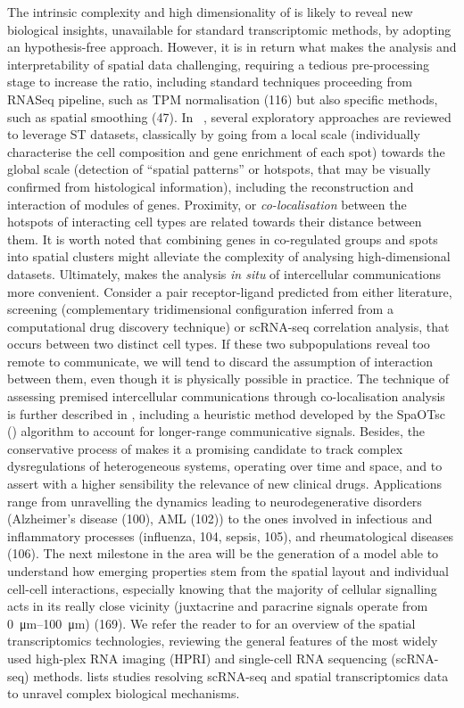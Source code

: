 The intrinsic complexity and high dimensionality of  is likely to reveal new biological insights, unavailable for standard transcriptomic methods, by adopting an hypothesis-free approach. However, it is in return what makes the analysis and interpretability of spatial data challenging, requiring a tedious pre-processing stage to increase the  ratio, including standard techniques proceeding from RNASeq pipeline, such as TPM normalisation (116) but also specific methods, such as spatial smoothing (47). 
In ~\autocite[Fig.~2]{rao_etal21}, several exploratory approaches are reviewed to leverage ST datasets, classically by going from a local scale (individually characterise the cell composition and gene enrichment of each spot) towards the global scale (detection of \enquote{spatial patterns} or hotspots, that may be visually confirmed from histological information), including the reconstruction and interaction of modules of genes. Proximity, or \textit{co-localisation} between the hotspots of interacting cell types are related towards their distance between them. It is worth noted that combining genes in co-regulated groups and spots into spatial clusters might alleviate the complexity of analysing high-dimensional datasets. Ultimately,  makes the analysis \textit{in situ} of intercellular communications more convenient. Consider a pair receptor-ligand predicted from either literature, screening (complementary tridimensional configuration inferred from a computational drug discovery technique) or scRNA-seq correlation analysis, that occurs between two distinct cell types. If these two subpopulations reveal too remote to communicate, we will tend to discard the assumption of interaction between them, even though it is physically possible in practice. The technique of assessing premised intercellular communications through co-localisation analysis is further described in \autocite[Figure 5]{longo_etal21}, including a heuristic method developed by the SpaOTsc (\autocite{cang_nie20}) algorithm to account for longer-range communicative signals. 
Besides, the conservative process of  makes it a promising candidate to track complex dysregulations of heterogeneous systems, operating over time and space, and to assert with a higher sensibility the relevance of new clinical drugs. Applications range from unravelling the dynamics leading to neurodegenerative disorders (Alzheimer’s disease (100), AML (102)) to the ones involved in infectious and inflammatory processes (influenza, 104, sepsis, 105), and rheumatological diseases (106). 
The next milestone in the area will be the generation of a model able to understand how emerging properties stem from the spatial layout and individual cell-cell interactions, especially knowing that the majority of cellular signalling acts in its really close vicinity (juxtacrine and paracrine signals operate from \qtyrange{0}{100}{\micro \metre}) (169). We refer the reader to \autocite[Table 1]{longo_etal21} for an overview of the spatial transcriptomics technologies, reviewing the general features of the most widely used high-plex RNA imaging (HPRI) and single-cell RNA sequencing (scRNA-seq) methods. \autocite[Table 1]{longo_etal21} lists studies resolving scRNA-seq and spatial transcriptomics data to unravel complex biological mechanisms. 


